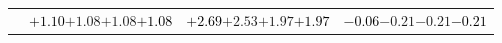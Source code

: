 \documentclass[compress]{beamer}
\begin{document}
\begin{frame}
\begin{tabular}{r | c | c | c}
          & \textcolor{black}{$+1.10$}\hspace{0.1 cm}$+1.08$\hspace{0.1 cm}$+1.08$\hspace{0.1 cm}\textcolor{black}{$+1.08$} & \textcolor{black}{$+2.69$}\hspace{0.1 cm}$+2.53$\hspace{0.1 cm}$+1.97$\hspace{0.1 cm}\textcolor{black}{$+1.97$} & \textcolor{black}{$-0.06$}\hspace{0.1 cm}$-0.21$\hspace{0.1 cm}$-0.21$\hspace{0.1 cm}\textcolor{black}{$-0.21$} \\
\end{tabular}
\end{frame}
\end{document}
